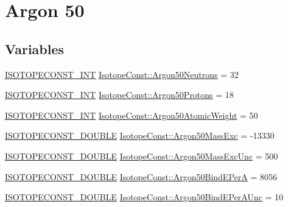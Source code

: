 \hypertarget{group___isotope_const-_argon-_ar50}{}\section{Argon 50}
\label{group___isotope_const-_argon-_ar50}
\subsection*{Variables}
\begin{DoxyCompactItemize}
\item 
\mbox{\hyperlink{group___isotope_const-_macros_ga5f18360b3e99483a35c32d789e62621c}{I\+S\+O\+T\+O\+P\+E\+C\+O\+N\+S\+T\+\_\+\+I\+NT}} \mbox{\hyperlink{group___isotope_const-_argon-_ar50_gaeab20f56f2d542b0efd4c0a33dce5dee}{Isotope\+Const\+::\+Argon50\+Neutrons}} = 32
\item 
\mbox{\hyperlink{group___isotope_const-_macros_ga5f18360b3e99483a35c32d789e62621c}{I\+S\+O\+T\+O\+P\+E\+C\+O\+N\+S\+T\+\_\+\+I\+NT}} \mbox{\hyperlink{group___isotope_const-_argon-_ar50_ga698ba2bf26cb505b8671d3a7cc4d3359}{Isotope\+Const\+::\+Argon50\+Protons}} = 18
\item 
\mbox{\hyperlink{group___isotope_const-_macros_ga5f18360b3e99483a35c32d789e62621c}{I\+S\+O\+T\+O\+P\+E\+C\+O\+N\+S\+T\+\_\+\+I\+NT}} \mbox{\hyperlink{group___isotope_const-_argon-_ar50_ga3542b2421cd53ba32cc6745435bb3b50}{Isotope\+Const\+::\+Argon50\+Atomic\+Weight}} = 50
\item 
\mbox{\hyperlink{group___isotope_const-_macros_ga8f45a7272ce02c0b4c65c44636ed719a}{I\+S\+O\+T\+O\+P\+E\+C\+O\+N\+S\+T\+\_\+\+D\+O\+U\+B\+LE}} \mbox{\hyperlink{group___isotope_const-_argon-_ar50_gab1791b8070105481dee1f14c28248531}{Isotope\+Const\+::\+Argon50\+Mass\+Exc}} = -\/13330
\item 
\mbox{\hyperlink{group___isotope_const-_macros_ga8f45a7272ce02c0b4c65c44636ed719a}{I\+S\+O\+T\+O\+P\+E\+C\+O\+N\+S\+T\+\_\+\+D\+O\+U\+B\+LE}} \mbox{\hyperlink{group___isotope_const-_argon-_ar50_ga26a3dfcdc0caf1e1864fe63f29e318ef}{Isotope\+Const\+::\+Argon50\+Mass\+Exc\+Unc}} = 500
\item 
\mbox{\hyperlink{group___isotope_const-_macros_ga8f45a7272ce02c0b4c65c44636ed719a}{I\+S\+O\+T\+O\+P\+E\+C\+O\+N\+S\+T\+\_\+\+D\+O\+U\+B\+LE}} \mbox{\hyperlink{group___isotope_const-_argon-_ar50_gab86628f473be7f1fe03cf0efe174c1ad}{Isotope\+Const\+::\+Argon50\+Bind\+E\+PerA}} = 8056
\item 
\mbox{\hyperlink{group___isotope_const-_macros_ga8f45a7272ce02c0b4c65c44636ed719a}{I\+S\+O\+T\+O\+P\+E\+C\+O\+N\+S\+T\+\_\+\+D\+O\+U\+B\+LE}} \mbox{\hyperlink{group___isotope_const-_argon-_ar50_ga03fe51412c8b2bb8d7e43bb5066938bd}{Isotope\+Const\+::\+Argon50\+Bind\+E\+Per\+A\+Unc}} = 10

\end{DoxyCompactItemize}
